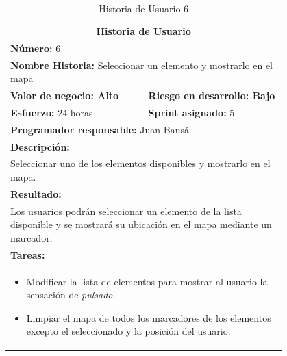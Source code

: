 	\begin{table}[H]
	  \centering 
	 	\begin{tabular}{p{0.4\linewidth}p{0.4\linewidth}}
	    \toprule
	    \multicolumn{2}{c}{\cellcolor{black!30}\textbf{Historia de Usuario}} 													\\
		\multicolumn{2}{l}{\cellcolor{gray!25}\textbf{Número: }6}																\\
		\multicolumn{2}{l}{\textbf{Nombre Historia: } Seleccionar un elemento y mostrarlo en el mapa}							\\
		\cellcolor{gray!25}\textbf{Valor de negocio: Alto}	&	\cellcolor{gray!25}\textbf{Riesgo en desarrollo: Bajo}		\\
		\textbf{Esfuerzo:} 24 horas				&	\textbf{Sprint asignado: }5 												\\
		\multicolumn{2}{l}{\cellcolor{gray!25}\textbf{Programador responsable: }Juan Bausá}									\\
		\multicolumn{2}{l}{\textbf{Descripción:}}                                                     						\\
		\multicolumn{2}{l}{\parbox{15cm}{Seleccionar uno de los elementos disponibles y mostrarlo en el mapa.}}				\\
		\multicolumn{2}{l}{\cellcolor{gray!25}\textbf{Resultado:}}																\\		
		\multicolumn{2}{l}{\parbox{15cm}{Los usuarios podrán seleccionar un elemento de la lista disponible y se mostrará su ubicación en el mapa mediante un marcador.}}																									\\
		\multicolumn{2}{l}{\textbf{Tareas:}}																					\\
		\multicolumn{2}{l}{
			\begin{minipage}{12cm}
	    		\vskip 4pt
	    		\begin{itemize}
	    			\item Modificar la lista de elementos para mostrar al usuario la sensación de \textit{pulsado}.
	    			\item Limpiar el mapa de todos los marcadores de los elementos excepto el seleccionado y la posición del usuario.
				\end{itemize}
			  	\vskip 4pt
		 	\end{minipage}
		} \\																				
	    \hline
	  \end{tabular}
	  \caption{Historia de Usuario 6}
	\end{table}
	
